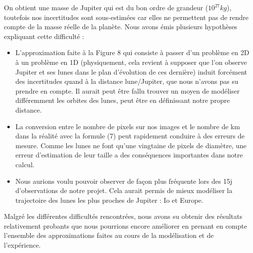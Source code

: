 \documentclass{aa}
\begin{document}
On obtient une masse de Jupiter qui est du bon ordre de grandeur ($10^{27} kg$), toutefois nos incertitudes sont sous-estimées car elles ne permettent pas de rendre compte de la masse réelle de la planète.
Nous avons émis plusieurs hypothèses expliquant cette difficulté : 
\begin{itemize}
    \item L'approximation faite à la Figure 8 qui consiste à passer d'un problème en 2D à un problème en 1D (physiquement, cela revient à supposer que l'on observe Jupiter et ses lunes dans le plan d'évolution de ces dernière) induit forcément des incertitudes quand à la distance lune/Jupiter, que nous n'avons pas su prendre en compte. Il aurait peut être fallu trouver un moyen de modéliser différemment les orbites des lunes, peut être en définissant notre propre distance.
    \item La conversion entre le nombre de pixels sur nos images et le nombre de km dans la réalité avec la formule (7) peut rapidement conduire à des erreurs de mesure. Comme les lunes ne font qu'une vingtaine de pixels de diamètre, une erreur d'estimation de leur taille a des conséquences importantes dans notre calcul.
    \item Nous aurions voulu pouvoir observer de façon plus fréquente lors des 15j d'observations de notre projet. Cela aurait permis de mieux modéliser la trajectoire des lunes les plus proches de Jupiter : Io et Europe.
\end{itemize}

Malgré les différentes difficultés rencontrées, nous avons su obtenir des résultats relativement probants que nous pourrions encore améliorer en prenant en compte l'ensemble des approximations faites au cours de la modélisation et de l'expérience.
\end{document}
